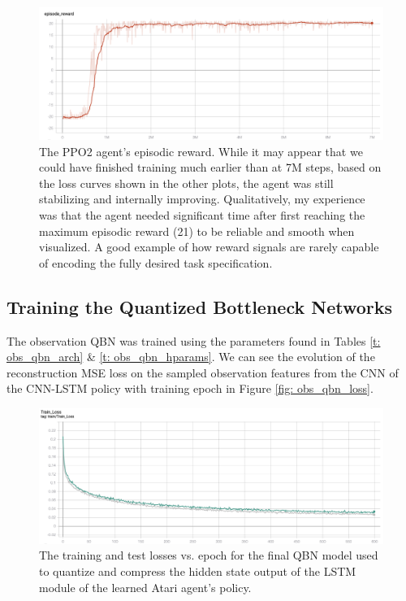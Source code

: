 \begin{figure}
    \centering
    \includegraphics[width=\textwidth]{Figures/ppo2_reward.png}
    \caption{The PPO2 agent's episodic reward. While it may appear that we could have finished training much earlier than at 7M steps, based on the loss curves shown in the other plots, the agent was still stabilizing and internally improving. Qualitatively, my experience was that the agent needed significant time after first reaching the maximum episodic reward (21) to be reliable and smooth when visualized. A good example of how reward signals are rarely capable of encoding the fully desired task specification.}
    \label{fig: ppo2_reward}
\end{figure}

\subsection{Training the Quantized Bottleneck Networks}

The observation QBN was trained using the parameters found in Tables \ref{t: obs_qbn_arch} \& \ref{t: obs_qbn_hparams}. We can see the evolution of the reconstruction MSE loss on the sampled observation features from the CNN of the CNN-LSTM policy with training epoch in Figure \ref{fig: obs_qbn_loss}.

\begin{figure}
    \centering
    \includegraphics[width=\textwidth]{Figures/hid_state_qbn_loss.PNG}
    \caption{The training and test losses vs. epoch for the final QBN model used to quantize and compress the hidden state output of the LSTM module of the learned Atari agent's policy.}
    \label{fig: hid_state_qbn_loss}
\end{figure}

